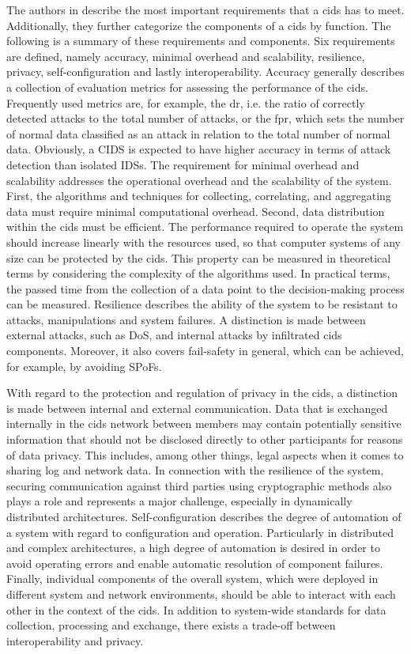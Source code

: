 The authors in \cite{Vasilomanolakis2015SkipMon} describe the most important requirements that a \gls{cids} has to meet. Additionally, they further categorize the components of a \gls{cids} by function. The following is a summary of these requirements and components. Six requirements are defined, namely accuracy, minimal overhead and scalability, resilience, privacy, self-configuration and lastly interoperability. Accuracy generally describes a collection of evaluation metrics for assessing the performance of the \gls{cids}. Frequently used metrics are, for example, the \gls{dr}, i.e. the ratio of correctly detected attacks to the total number of attacks, or the \gls{fpr}, which sets the number of normal data classified as an attack in relation to the total number of normal data. Obviously, a CIDS is expected to have higher accuracy in terms of attack detection than isolated IDSs. The requirement for minimal overhead and scalability addresses the operational overhead and the scalability of the system. First, the algorithms and techniques for collecting, correlating, and aggregating data must require minimal computational overhead. Second, data distribution within the \acrshort{cids} must be efficient. The performance required to operate the system should increase linearly with the resources used, so that computer systems of any size can be protected by the \gls{cids}. This property can be measured in theoretical terms by considering the complexity of the algorithms used. In practical terms, the passed time from the collection of a data point to the decision-making process can be measured. Resilience describes the ability of the system to be resistant to attacks, manipulations and system failures. A distinction is made between external attacks, such as DoS, and internal attacks by infiltrated \gls{cids} components. Moreover, it also covers fail-safety in general, which can be achieved, for example, by avoiding SPoFs. 

With regard to the protection and regulation of privacy in the \gls{cids}, a distinction is made between internal and external communication. Data that is exchanged internally in the \gls{cids} network between members may contain potentially sensitive information that should not be disclosed directly to other participants for reasons of data privacy. This includes, among other things, legal aspects when it comes to sharing log and network data. In connection with the resilience of the system, securing communication against third parties using cryptographic methods also plays a role and represents a major challenge, especially in dynamically distributed architectures. Self-configuration describes the degree of automation of a system with regard to configuration and operation. Particularly in distributed and complex architectures, a high degree of automation is desired in order to avoid operating errors and enable automatic resolution of component failures. Finally, individual components of the overall system, which were deployed in different system and network environments, should be able to interact with each other in the context of the \gls{cids}. In addition to system-wide standards for data collection, processing and exchange, there exists a trade-off between interoperability and privacy.

